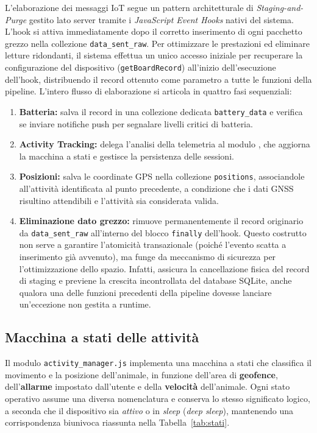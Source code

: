 \documentclass[12pt,a4paper]{article}
\begin{document}
L'elaborazione dei messaggi IoT segue un pattern architetturale di \textit{Staging-and-Purge} 
gestito lato server tramite i \textit{JavaScript Event Hooks} nativi del sistema. 
L'hook  si attiva immediatamente dopo il corretto inserimento
di ogni pacchetto grezzo nella collezione \texttt{data\_sent\_raw}. 
Per ottimizzare le prestazioni ed eliminare letture ridondanti,
il sistema effettua un unico accesso iniziale per recuperare la configurazione del dispositivo (\texttt{getBoardRecord}) 
all'inizio dell'esecuzione dell'hook, distribuendo il record ottenuto come parametro a tutte le funzioni della pipeline. 
L'intero flusso di elaborazione si articola in quattro fasi sequenziali:

\begin{enumerate}
    \item \textbf{Batteria:} salva il record in una collezione dedicata \texttt{battery\_data} e verifica se inviare notifiche push per segnalare livelli critici di batteria.
    \item \textbf{Activity Tracking:} delega l'analisi della telemetria al modulo , che aggiorna la macchina a stati e gestisce la persistenza delle sessioni.
    \item \textbf{Posizioni:} salva le coordinate GPS nella collezione \texttt{positions}, associandole all'attività identificata al punto precedente, a condizione che i dati GNSS risultino attendibili e l'attività sia considerata valida.
    \item \textbf{Eliminazione dato grezzo:} rimuove permanentemente il record originario da \texttt{data\_sent\_raw} all'interno del blocco \texttt{finally} dell'hook. Questo costrutto non serve a garantire l'atomicità transazionale (poiché l'evento scatta a inserimento già avvenuto), ma funge da meccanismo di sicurezza per l'ottimizzazione dello spazio. Infatti, assicura la cancellazione fisica del record di staging e previene la crescita incontrollata del database SQLite, anche qualora una delle funzioni precedenti della pipeline dovesse lanciare un'eccezione non gestita a runtime.
\end{enumerate}

\subsection{Macchina a stati delle attività}

Il modulo \texttt{activity\_manager.js} implementa una macchina a stati 
che classifica il movimento e la posizione dell'animale, 
in funzione dell'area di \textbf{geofence}, dell'\textbf{allarme} impostato dall'utente 
e della \textbf{velocità} dell'animale.
Ogni stato operativo assume una diversa nomenclatura e conserva lo stesso significato logico, 
a seconda che il dispositivo sia \textit{attivo} o in \textit{sleep} (\textit{deep sleep}), 
mantenendo una corrispondenza biunivoca riassunta nella Tabella~\ref{tab:stati}.
\end{document}
